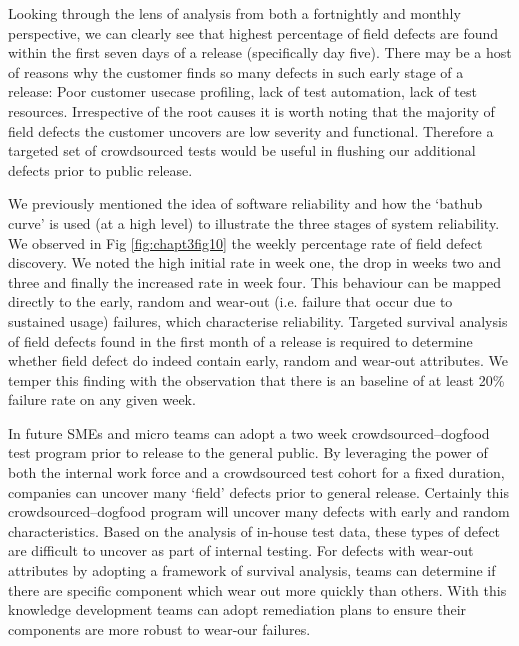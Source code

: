 Looking through the lens of analysis from both a fortnightly and monthly perspective, we can clearly see that highest
percentage of field defects are found within the first seven days of a release (specifically day five). There may be a host of reasons why the customer finds so many defects in such early stage of a release: Poor customer usecase profiling, lack of test automation, lack of test resources. Irrespective of the root causes it is worth noting that the majority of field defects the customer uncovers are low severity and functional. Therefore a targeted set of crowdsourced tests would be useful in flushing our additional defects prior to public release. \par 

We previously mentioned the idea of software reliability and how the `bathub curve' is used (at a high level) to illustrate the three stages of system reliability. We observed in Fig \ref{fig:chapt3fig10} the weekly percentage rate of field defect discovery. We noted the high initial rate in week one, the drop in weeks two and three and finally the increased rate in week four. This behaviour can be mapped directly to the early, random and wear-out (i.e. failure that occur due to sustained usage) failures, which characterise reliability. Targeted survival analysis of field defects found in the first month of a release is required to determine whether field defect do indeed contain early, random and wear-out attributes. We temper this finding with the observation that there is an baseline of at least 20\% failure rate on any given week.\par 

In future SMEs and micro teams can adopt a two week crowdsourced--dogfood test program prior to release to the
general public. By leveraging the power of both the internal work force and a crowdsourced test cohort for a fixed duration, companies can uncover many `field' defects prior to general release. Certainly this crowdsourced--dogfood program will uncover many defects with early and random characteristics. Based on the analysis of in-house test data, these types of defect are difficult to uncover as part of internal testing. For defects with wear-out attributes by adopting a framework of survival analysis, teams can determine if there are specific component which wear out more quickly than others. With this knowledge development teams can adopt remediation plans to ensure their components are more robust to wear-our failures. \par

